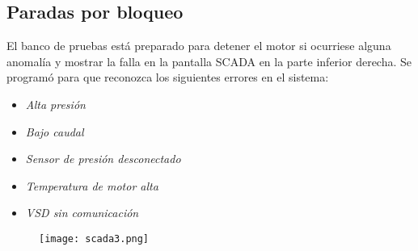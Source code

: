 \subsection{Paradas por bloqueo}
El banco de pruebas está preparado para detener el motor si ocurriese alguna anomalía y mostrar la falla en la pantalla SCADA en la parte inferior derecha. Se programó para que reconozca los siguientes errores en el sistema: 

\begin{itemize}
	\item \textit{Alta presión}
	\item \textit{Bajo caudal}
	\item \textit{Sensor de presión desconectado}
	\item \textit{Temperatura de motor alta}
	\item \textit{VSD sin comunicación}
\end{itemize}


\begin{figure}[htb]
	\centering
	\texttt{[image: scada3.png]}
	\label{fig:scada3}
\end{figure}

